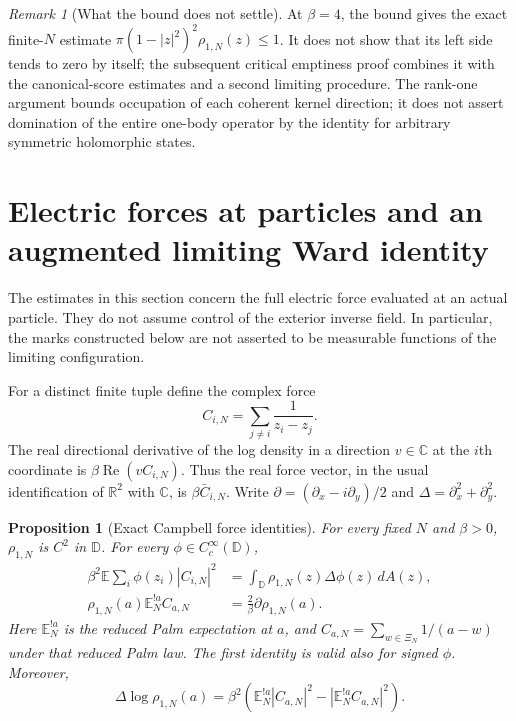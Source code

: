 \documentclass[11pt,a4paper]{article}
\numberwithin{equation}{section}
\newtheorem{proposition}[theorem]{Proposition}
\theoremstyle{definition}
\theoremstyle{remark}
\newtheorem{remark}[theorem]{Remark}
\newcommand{\D}{\mathbb D}
\newcommand{\E}{\mathbb E}
\newcommand{\C}{\mathbb C}
\newcommand{\R}{\mathbb R}
\begin{document}
\begin{remark}[What the bound does not settle]
At $\beta=4$, the bound gives the exact finite-$N$ estimate
$\pi(1-|z|^2)^2\rho_{1,N}(z)\leq1$. It does not show that its left side
tends to zero by itself; the subsequent critical emptiness proof combines
it with the canonical-score estimates and a second limiting procedure.
The rank-one argument bounds occupation of each coherent
kernel direction; it does not assert domination of the entire one-body
operator by the identity for arbitrary symmetric holomorphic states.
\end{remark}


\section{Electric forces at particles and an augmented limiting Ward identity}
\label{sec:campbell-force}

The estimates in this section concern the full electric force evaluated
at an actual particle. They do not assume control of the exterior
inverse field. In particular, the marks constructed below are not
asserted to be measurable functions of the limiting configuration.

For a distinct finite tuple define the complex force
\[
 C_{i,N}=\sum_{j\ne i}\frac1{z_i-z_j}.
\]
The real directional derivative of the log density in a direction
$v\in\C$ at the $i$th coordinate is
$\beta\operatorname{Re}(v C_{i,N})$. Thus the real force vector,
in the usual identification of $\R^2$ with $\C$, is $\beta\bar C_{i,N}$.
Write $\partial=(\partial_x-i\partial_y)/2$ and
$\Delta=\partial_x^2+\partial_y^2$.

\begin{proposition}[Exact Campbell force identities]
\label{prop:campbell-force-identities}
For every fixed $N$ and $\beta>0$, $\rho_{1,N}$ is $C^2$ in $\D$.
For every $\phi\in C_c^\infty(\D)$,
\begin{align}
 \beta^2\E\sum_i\phi(z_i)|C_{i,N}|^2
 &=\int_{\D}\rho_{1,N}(z)\Delta\phi(z)\,dA(z),
 \label{eq:campbell-force-square}\\
 \rho_{1,N}(a)\E_N^{!a}C_{a,N}
 &=\frac2\beta\partial\rho_{1,N}(a).
 \label{eq:campbell-force-mean}
\end{align}
Here $\E_N^{!a}$ is the reduced Palm expectation at $a$, and
$C_{a,N}=\sum_{w\in\Xi_N}1/(a-w)$ under that reduced Palm law.
The first identity is valid also for signed $\phi$.
Moreover,
\begin{equation}\label{eq:campbell-force-log-curvature}
 \Delta\log\rho_{1,N}(a)
 =\beta^2\left(\E_N^{!a}|C_{a,N}|^2
                       -|\E_N^{!a}C_{a,N}|^2\right).
\end{equation}
\end{proposition}
\end{document}
